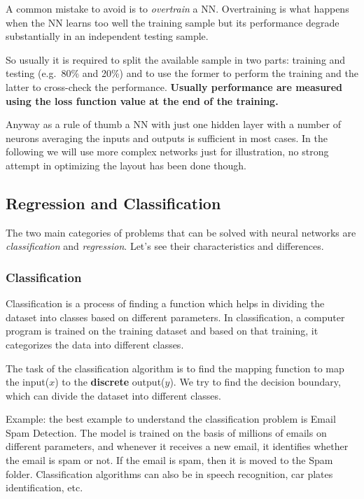 A common mistake to avoid is to \emph{overtrain} a NN. Overtraining is
what happens when the NN learns too well the training sample but its
performance degrade substantially in an independent testing sample.

So usually it is required to split the available sample in two parts:
training and testing (e.g.~80\% and 20\%) and to use the former to
perform the training and the latter to cross-check the performance.
\textbf{Usually performance are measured using the loss function value
	at the end of the training.}

Anyway as a rule of thumb a NN with just one hidden layer with a number
of neurons averaging the inputs and outputs is sufficient in most cases.
In the following we will use more complex networks just for
illustration, no strong attempt in optimizing the layout has been done
though.

\subsection{Regression and
		Classification}\label{regression-and-classification}

The two main categories of problems that can be solved with neural
networks are \emph{classification} and \emph{regression}. Let's see
their characteristics and differences.

\subsubsection{Classification}\label{classification}

Classification is a process of finding a function which helps in dividing
the dataset into classes based on different parameters. In
classification, a computer program is trained on the training dataset
and based on that training, it categorizes the data into different
classes.

The task of the classification algorithm is to find the mapping function
to map the input(\(x\)) to the \textbf{discrete} output(\(y\)). We try
to find the decision boundary, which can divide the dataset into
different classes.

Example: the best example to understand the classification problem is
Email Spam Detection. The model is trained on the basis of millions of
emails on different parameters, and whenever it receives a new email, it
identifies whether the email is spam or not. If the email is spam, then
it is moved to the Spam folder. Classification algorithms can also be in
speech recognition, car plates identification, etc.


